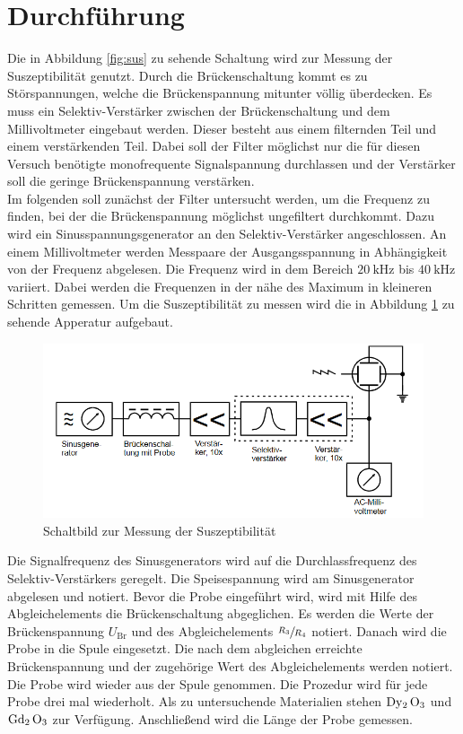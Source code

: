 \section{Durchführung}
\label{sec:Durchführung}
Die in Abbildung \ref{fig:sus} zu sehende Schaltung wird zur Messung der Suszeptibilität genutzt.
Durch die Brückenschaltung kommt es zu Störspannungen, welche die Brückenspannung mitunter völlig überdecken. Es muss ein Selektiv-Verstärker zwischen der Brückenschaltung und dem Millivoltmeter eingebaut werden.
Dieser besteht aus einem filternden Teil und einem verstärkenden Teil. Dabei soll der Filter möglichst nur die für diesen Versuch benötigte monofrequente Signalspannung durchlassen und der Verstärker 
soll die geringe Brückenspannung verstärken.
\\
Im folgenden soll zunächst der Filter untersucht werden, um die Frequenz zu finden, bei der die Brückenspannung möglichst ungefiltert durchkommt.
Dazu wird ein Sinusspannungsgenerator an den Selektiv-Verstärker angeschlossen. An einem Millivoltmeter werden Messpaare der Ausgangsspannung in Abhängigkeit von der
Frequenz abgelesen. Die Frequenz wird in dem Bereich $\SI{20}{\kilo \hertz}$ bis $\SI{40}{\kilo \hertz}$ variiert. Dabei werden die Frequenzen in der nähe des Maximum in kleineren Schritten gemessen.
Um die Suszeptibilität zu messen wird die in Abbildung \ref{fig:AU} zu sehende Apperatur aufgebaut.
\begin{figure}
    \centering
    \includegraphics[scale=0.4]{pics/AU.png}
    \caption{Schaltbild zur Messung der Suszeptibilität \cite{v606}}
    \label{fig:AU}
  \end{figure}
  Die Signalfrequenz des Sinusgenerators wird auf die Durchlassfrequenz des Selektiv-Verstärkers geregelt. Die Speisespannung wird am Sinusgenerator abgelesen und notiert.
  Bevor die Probe eingeführt wird, wird mit Hilfe des Abgleichelements die Brückenschaltung abgeglichen. Es werden die Werte der Brückenspannung $U_\text{Br}$ und des Abgleichelements $\sfrac{R_3}{R_4}$ notiert.
  Danach wird die Probe in die Spule eingesetzt. Die nach dem abgleichen erreichte Brückenspannung und der zugehörige Wert des Abgleichelements werden notiert.
  Die Probe wird wieder aus der Spule genommen. Die Prozedur wird für jede Probe drei mal wiederholt. Als zu untersuchende Materialien stehen $\ce{Dy2 O3}$ und $\ce{Gd2 O3}$ zur Verfügung.
  Anschließend wird die Länge der Probe gemessen.
